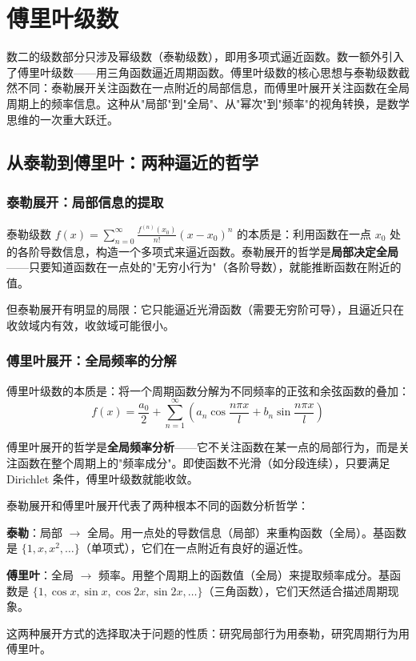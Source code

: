 
\section{傅里叶级数}

数二的级数部分只涉及幂级数（泰勒级数），即用多项式逼近函数。数一额外引入了傅里叶级数——用三角函数逼近周期函数。傅里叶级数的核心思想与泰勒级数截然不同：泰勒展开关注函数在一点附近的局部信息，而傅里叶展开关注函数在全局周期上的频率信息。这种从"局部"到"全局"、从"幂次"到"频率"的视角转换，是数学思维的一次重大跃迁。

\subsection{从泰勒到傅里叶：两种逼近的哲学}

\subsubsection{泰勒展开：局部信息的提取}

泰勒级数 $f(x) = \sum_{n=0}^\infty \frac{f^{(n)}(x_0)}{n!}(x-x_0)^n$ 的本质是：利用函数在一点 $x_0$ 处的各阶导数信息，构造一个多项式来逼近函数。泰勒展开的哲学是\textbf{局部决定全局}——只要知道函数在一点处的"无穷小行为"（各阶导数），就能推断函数在附近的值。

但泰勒展开有明显的局限：它只能逼近光滑函数（需要无穷阶可导），且逼近只在收敛域内有效，收敛域可能很小。

\subsubsection{傅里叶展开：全局频率的分解}

傅里叶级数的本质是：将一个周期函数分解为不同频率的正弦和余弦函数的叠加：
\[
f(x) = \frac{a_0}{2} + \sum_{n=1}^\infty \left(a_n\cos\frac{n\pi x}{l} + b_n\sin\frac{n\pi x}{l}\right)
\]

傅里叶展开的哲学是\textbf{全局频率分析}——它不关注函数在某一点的局部行为，而是关注函数在整个周期上的"频率成分"。即使函数不光滑（如分段连续），只要满足 Dirichlet 条件，傅里叶级数就能收敛。

\begin{essencebox}
泰勒展开和傅里叶展开代表了两种根本不同的函数分析哲学：

\textbf{泰勒}：局部 $\to$ 全局。用一点处的导数信息（局部）来重构函数（全局）。基函数是 $\{1, x, x^2, \ldots\}$（单项式），它们在一点附近有良好的逼近性。

\textbf{傅里叶}：全局 $\to$ 频率。用整个周期上的函数值（全局）来提取频率成分。基函数是 $\{1, \cos x, \sin x, \cos 2x, \sin 2x, \ldots\}$（三角函数），它们天然适合描述周期现象。

这两种展开方式的选择取决于问题的性质：研究局部行为用泰勒，研究周期行为用傅里叶。
\end{essencebox}

